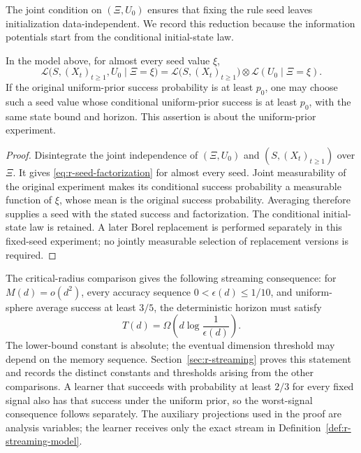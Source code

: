 The joint condition on \((\Xi,U_0)\) ensures that fixing the rule
seed leaves initialization data-independent.  We record this
reduction because the information potentials start from the
conditional initial-state law.

\begin{lemma}\label{lem:r-seed-reduction}
In the model above, for almost every seed value \(\xi\),
\begin{equation}\label{eq:r-seed-factorization}
 \mathcal L\bigl(S,(X_t)_{t\ge1},U_0\mid\Xi=\xi\bigr)
 =\mathcal L\bigl(S,(X_t)_{t\ge1}\bigr)
       \otimes\mathcal L(U_0\mid\Xi=\xi).
\end{equation}
If the original uniform-prior success probability is at least
\(p_0\), one may choose such a seed value whose conditional
uniform-prior success is at least \(p_0\), with the same state
bound and horizon.  This assertion is about the uniform-prior
experiment.
\end{lemma}

\begin{proof}
Disintegrate the joint independence of
\((\Xi,U_0)\) and \((S,(X_t)_{t\ge1})\) over \(\Xi\).
It gives \eqref{eq:r-seed-factorization} for almost every seed.
Joint measurability of the original experiment makes its conditional
success probability a measurable function of \(\xi\), whose mean
is the original success probability.  Averaging therefore supplies
a seed with the stated success and factorization.  The conditional
initial-state law is retained.  A later Borel replacement is
performed separately in this fixed-seed experiment; no jointly
measurable selection of replacement versions is required.
\end{proof}

The critical-radius comparison gives the following streaming
consequence: for \(M(d)=o(d^2)\), every accuracy sequence
\(0<\epsilon(d)\le1/10\), and uniform-sphere average success at
least \(3/5\), the deterministic horizon must satisfy
\[
 T(d)=\Omega\!\left(d\log\frac1{\epsilon(d)}\right).
\]
The lower-bound constant is absolute; the eventual dimension
threshold may depend on the memory sequence.  Section~\ref{sec:r-streaming}
proves this statement and records the distinct constants and
thresholds arising from the other comparisons.  A learner that
succeeds with probability at least \(2/3\) for every fixed signal
also has that success under the uniform prior, so the worst-signal
consequence follows separately.  The auxiliary projections used in
the proof are analysis variables; the learner receives only the
exact stream in Definition~\ref{def:r-streaming-model}.

